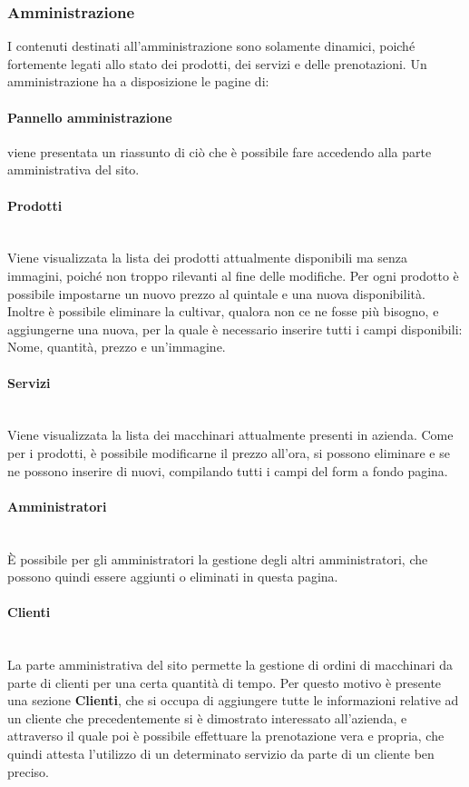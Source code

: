\subsubsection{Amministrazione}
I contenuti destinati all'amministrazione sono solamente dinamici, poiché fortemente legati allo stato dei prodotti, dei servizi e delle prenotazioni. Un amministrazione ha a disposizione le pagine di:
\paragraph{Pannello amministrazione} viene presentata un riassunto di ciò che è possibile fare accedendo alla parte amministrativa del sito.
\paragraph{Prodotti}
~\\Viene visualizzata la lista dei prodotti attualmente disponibili ma senza immagini, poiché non troppo rilevanti al fine delle modifiche. Per ogni prodotto è possibile impostarne un nuovo prezzo al quintale e una nuova disponibilità. Inoltre è possibile eliminare la cultivar, qualora non ce ne fosse più bisogno, e aggiungerne una nuova, per la quale è necessario inserire tutti i campi disponibili: Nome, quantità, prezzo e un'immagine.
\paragraph{Servizi}
~\\Viene visualizzata la lista dei macchinari attualmente presenti in azienda. Come per i prodotti, è possibile modificarne il prezzo all'ora, si possono eliminare e se ne possono inserire di nuovi, compilando tutti i campi del form a fondo pagina.
\paragraph{Amministratori}
~\\È possibile per gli amministratori la gestione degli altri amministratori, che possono quindi essere aggiunti o eliminati in questa pagina.
\paragraph{Clienti}
~\\La parte amministrativa del sito permette la gestione di ordini di macchinari da parte di clienti per una certa quantità di tempo. Per questo motivo è presente una sezione \textbf{Clienti}, che si occupa di aggiungere tutte le informazioni relative ad un cliente che precedentemente si è dimostrato interessato all'azienda, e attraverso il quale poi è possibile effettuare la prenotazione vera e propria, che quindi attesta l'utilizzo di un determinato servizio da parte di un cliente ben preciso.
